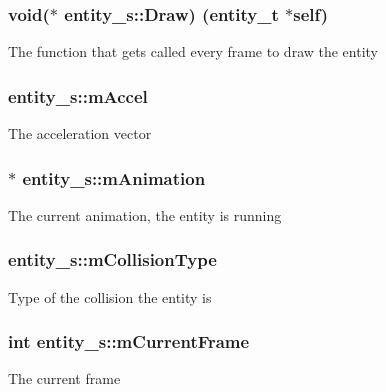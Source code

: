 \subsubsection[{\texorpdfstring{Draw}{Draw}}]{\setlength{\rightskip}{0pt plus 5cm}void($\ast$ entity\+\_\+s\+::\+Draw) ({\bf entity\+\_\+t} $\ast$self)}\hypertarget{structentity__s_a120dcf9d340bb5ee99084afc4a1bf293}{}\label{structentity__s_a120dcf9d340bb5ee99084afc4a1bf293}
The function that gets called every frame to draw the entity 
\subsubsection[{\texorpdfstring{m\+Accel}{mAccel}}]{ entity\+\_\+s\+::m\+Accel}\hypertarget{structentity__s_aba78cc9ed761f397ba6ad698704c3a63}{}\label{structentity__s_aba78cc9ed761f397ba6ad698704c3a63}
The acceleration vector 
\subsubsection[{\texorpdfstring{m\+Animation}{mAnimation}}]{$\ast$ entity\+\_\+s\+::m\+Animation}\hypertarget{structentity__s_ad464763e1aa713bd82f953fb139810c1}{}\label{structentity__s_ad464763e1aa713bd82f953fb139810c1}
The current animation, the entity is running 
\subsubsection[{\texorpdfstring{m\+Collision\+Type}{mCollisionType}}]{ entity\+\_\+s\+::m\+Collision\+Type}\hypertarget{structentity__s_aff6d73a9efeac0929da697cde607a8bc}{}\label{structentity__s_aff6d73a9efeac0929da697cde607a8bc}
Type of the collision the entity is 
\subsubsection[{\texorpdfstring{m\+Current\+Frame}{mCurrentFrame}}]{\setlength{\rightskip}{0pt plus 5cm}int entity\+\_\+s\+::m\+Current\+Frame}\hypertarget{structentity__s_ada34ca9a8b88e0f09d9db8d326f3a4be}{}\label{structentity__s_ada34ca9a8b88e0f09d9db8d326f3a4be}
The current frame 
